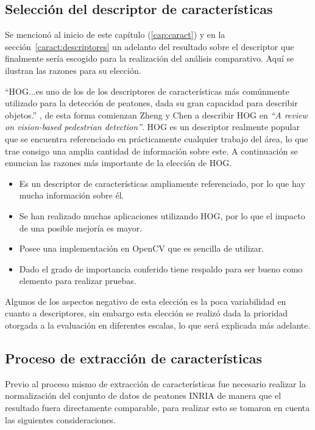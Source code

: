 \subsection{Selección del descriptor de características}

Se mencionó al inicio de este capítulo (\ref{cap:caract}) y en la sección~\ref{caract:descriptores} un adelanto del resultado sobre el descriptor que finalmente sería escogido para la realización del análisis comparativo. Aquí se ilustran las razones para su elección.

``HOG...es uno de los de los descriptores de características más comúnmente utilizado para la detección de peatones, dada su gran capacidad para describir objetos.'' \citep{Zheng2012}, de esta forma comienzan Zheng y Chen a describir HOG en \textit{``A review on vision-based pedestrian detection''}. HOG es un descriptor realmente popular que se encuentra referenciado en prácticamente cualquier trabajo del área, lo que trae consigo una amplia cantidad de información sobre este. A continuación se enuncian las razones más importante de la elección de HOG.

\begin{itemize}
\item Es un descriptor de características ampliamente referenciado, por lo que hay mucha información sobre él.
\item Se han realizado muchas aplicaciones utilizando HOG, por lo que el impacto de una posible mejoría es mayor.
\item Posee una implementación en OpenCV que es sencilla de utilizar.
\item Dado el grado de importancia conferido tiene respaldo para ser bueno como elemento para realizar pruebas.
\end{itemize}

Algunos de los aspectos negativo de esta elección es la poca variabilidad en cuanto a descriptores, sin embargo esta elección se realizó dada la prioridad otorgada a la evaluación en diferentes escalas, lo que será explicada más adelante.

\subsection{Proceso de extracción de características}
\label{caract:extraccion}

Previo al proceso mismo de extracción de características fue necesario realizar la normalización del conjunto de datos de peatones INRIA de manera que el resultado fuera directamente comparable, para realizar esto se tomaron en cuenta las siguientes consideraciones.

